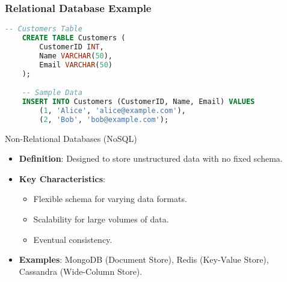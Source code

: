\documentclass[aspectratio=169]{beamer}
\begin{document}
\begin{frame}[fragile]
    \frametitle{Relational Database Example}
    \begin{lstlisting}[language=SQL]
    -- Customers Table
    CREATE TABLE Customers (
        CustomerID INT,
        Name VARCHAR(50),
        Email VARCHAR(50)
    );

    -- Sample Data
    INSERT INTO Customers (CustomerID, Name, Email) VALUES
        (1, 'Alice', 'alice@example.com'),
        (2, 'Bob', 'bob@example.com');
    \end{lstlisting}
    \begin{block}{Non-Relational Databases (NoSQL)}
        \begin{itemize}
            \item \textbf{Definition}: Designed to store unstructured data with no fixed schema.
            \item \textbf{Key Characteristics}:
            \begin{itemize}
                \item Flexible schema for varying data formats.
                \item Scalability for large volumes of data.
                \item Eventual consistency.
            \end{itemize}
            \item \textbf{Examples}: MongoDB (Document Store), Redis (Key-Value Store), Cassandra (Wide-Column Store).
        \end{itemize}
    \end{block}
\end{frame}
\end{document}
